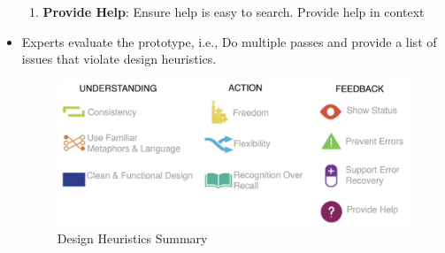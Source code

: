 \documentclass[a4paper]{article}
\begin{document}
\begin{itemize}
\begin{enumerate}
        \item \textbf{Provide Help}: Ensure help is easy to search. Provide help in context
    \end{enumerate}
    \item Experts evaluate the prototype, i.e., Do multiple passes and provide a list of issues that violate design heuristics.
    \begin{figure}[H]
        \centering
        \includegraphics[width=0.5\linewidth]{Degree//static/SE_heuristic_summary.png}
        \caption{Design Heuristics Summary}
        \label{fig:ST-design-heuristic-summary}
    \end{figure}
\end{itemize}
\end{document}

